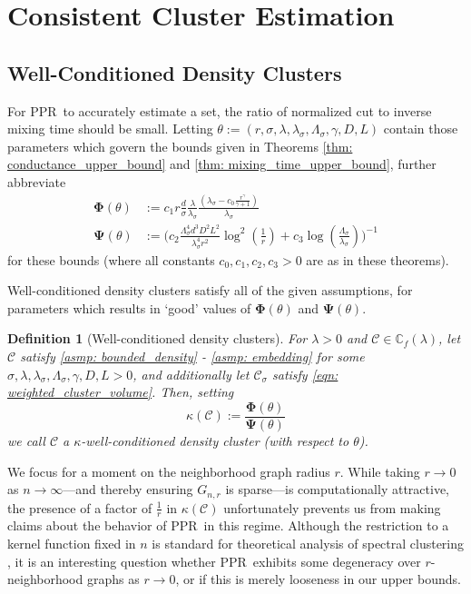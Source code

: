 \documentclass{article}
\newcommand{\1}{\mathbf{1}}
\newcommand{\Phibf}{\mathbf{\Phi}}
\newcommand{\Psibf}{\mathbf{\Psi}}
\newcommand{\Cbb}{\mathbb{C}}
\newcommand{\Cset}{\mathcal{C}}
\newcommand{\Csig}{\Cset_{\sigma}}
\newcommand{\pprspace}{{\sc PPR~}}
\theoremstyle{aldenthm}
\newtheorem{definition}{Definition}
\theoremstyle{aldenrmrk}
\begin{document}
\section{Consistent Cluster Estimation}
\label{sec: consistent_cluster_estimation_with_ppr}

\subsection{Well-Conditioned Density Clusters}

For \pprspace to accurately estimate a set, the ratio of normalized cut to inverse mixing time should be small. Letting $\theta := (r, \sigma, \lambda, \lambda_{\sigma}, \Lambda_{\sigma}, \gamma, D, L)$ contain those parameters which govern the bounds given in Theorems \ref{thm: conductance_upper_bound} and \ref{thm: mixing_time_upper_bound}, further abbreviate
\begin{align*}
\mathbf{\Phi}(\theta) 
& := c_1 r \frac{d}{\sigma} \frac{\lambda}{\lambda_{\sigma}} \frac{(\lambda_{\sigma} - c_0 \frac{r^{\gamma}}{\gamma + 1})}{\lambda_{\sigma}} \\
\mathbf{\Psi}(\theta) & := \Biggl(c_2 \frac{\Lambda_{\sigma}^4 d^3 D^2 L^2}{\lambda_{\sigma}^4 r^2} \log^2\left(\frac{1}{r}\right) + c_3 \log\left(\frac{\Lambda_{\sigma}}{\lambda_{\sigma}}\right) \Biggr)^{-1}
\end{align*}
for these bounds (where all constants $c_0,c_1,c_2,c_3 >0$ are as in these theorems).

Well-conditioned density clusters satisfy all of the given assumptions, for parameters which results in `good' values of $\Phibf(\theta)$ and $\Psibf(\theta)$.
\begin{definition}[Well-conditioned density clusters]
	For $\lambda > 0$ and $\Cset \in \Cbb_f(\lambda)$, let $\Cset$ satisfy \ref{asmp: bounded_density} - \ref{asmp: embedding} for some $\sigma, \lambda, \lambda_{\sigma}, \Lambda_{\sigma}, \gamma, D, L > 0$, and additionally let $\Csig$ satisfy \eqref{eqn: weighted_cluster_volume}. Then, setting
	\begin{equation*}
	\kappa(\Cset) := \frac{\mathbf{\Phi}(\theta)}{\mathbf{\Psi}(\theta)}
	\end{equation*}
	we call $\Cset$ a \textrm{$\kappa$-well-conditioned density cluster (with respect to $\theta$).}
\end{definition}

We focus for a moment on the neighborhood graph radius $r$. While taking $r \to 0$ as $n \to \infty$---and thereby ensuring $G_{n,r}$ is sparse---is computationally attractive, the presence of a factor of $\frac{1}{r}$ in $\kappa(\Cset)$ unfortunately prevents us from making claims about the behavior of \pprspace in this regime. Although the restriction to a kernel function fixed in $n$ is standard for theoretical analysis of spectral clustering \cite{schiebinger2015,vonluxburg2008}, it is an interesting question whether \pprspace exhibits some degeneracy over $r$-neighborhood graphs as $r \to 0$, or if this is merely looseness in our upper bounds.
\end{document}
